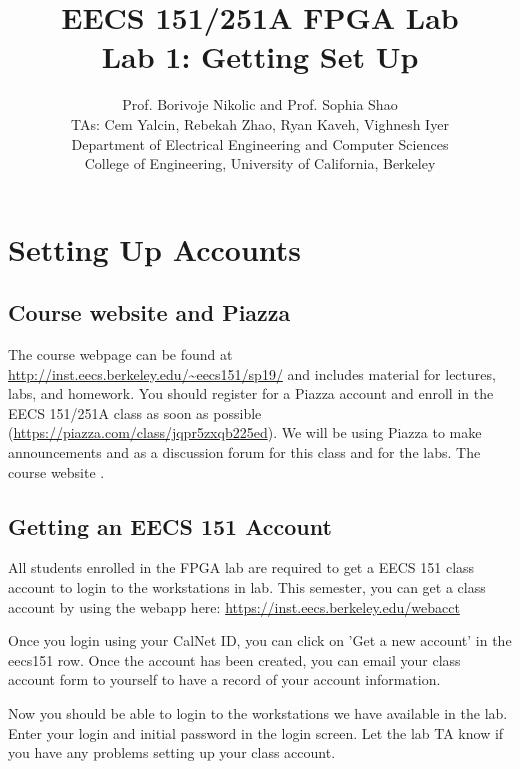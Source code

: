 \documentclass[11pt]{article}
\begin{document}
\title{EECS 151/251A FPGA Lab\\
Lab 1: Getting Set Up}

\author{Prof. Borivoje Nikolic and Prof. Sophia Shao \\
TAs: Cem Yalcin, Rebekah Zhao, Ryan Kaveh, Vighnesh Iyer \\ Department of Electrical Engineering and Computer Sciences\\
College of Engineering, University of California, Berkeley}

\date{}
\maketitle

\section{Setting Up Accounts}

\subsection{Course website and Piazza}
The course webpage can be found at \url{http://inst.eecs.berkeley.edu/~eecs151/sp19/} and includes material for lectures, labs, and homework.  You should register for a Piazza account and enroll in the EECS 151/251A class as soon as possible (\url{https://piazza.com/class/jqpr5zxqb225ed}). We will be using Piazza to make announcements and as a discussion forum for this class and for the labs. The course website .

\subsection{Getting an EECS 151 Account}
All students enrolled in the FPGA lab are required to get a EECS 151 class account to login to the workstations in lab. This semester, you can get a class account by using the webapp here:
\url{https://inst.eecs.berkeley.edu/webacct}

Once you login using your CalNet ID, you can click on 'Get a new account' in the eecs151 row. Once the account has been created, you can email your class account form to yourself to have a record of your account information.

Now you should be able to login to the workstations we have available in the lab. Enter your login and initial password in the login screen. Let the lab TA know if you have any problems setting up your class account.
\end{document}
